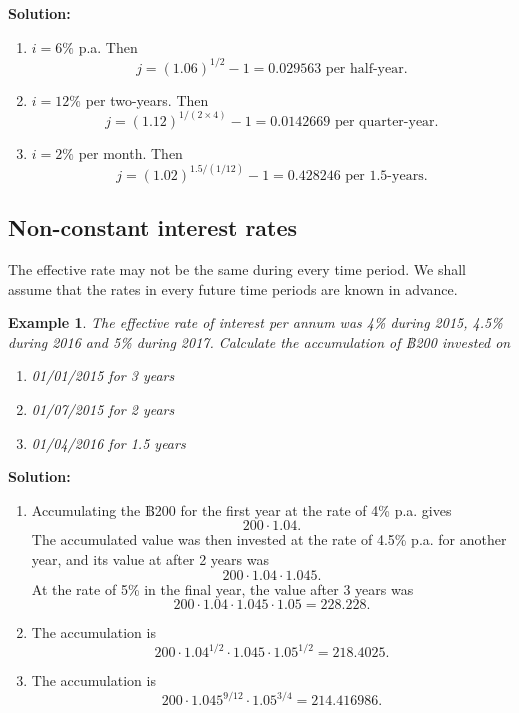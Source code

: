 \documentclass[
]{book}
\theoremstyle{definition}
\theoremstyle{definition}
\newtheorem{example}{Example}[chapter]
\theoremstyle{definition}
\theoremstyle{definition}
\theoremstyle{remark}
\begin{document}
\textbf{Solution:}

\begin{enumerate}
\def\labelenumi{\arabic{enumi}.}
\item
  \(i = 6\%\) p.a. Then
  \[j = (1.06)^{1/2} -1 = 0.029563 \text{ per half-year}.\]
\item
  \(i = 12\%\) per two-years. Then
  \[j = (1.12)^{1/(2\times4)} -1 = 0.0142669 \text{ per quarter-year}.\]
\item
  \(i = 2\%\) per month. Then
  \[j = (1.02)^{1.5/(1/12)} -1 = 0.428246 \text{ per 1.5-years}.\]
\end{enumerate}

\hypertarget{non-constant-interest-rates}{%
\subsection{Non-constant interest rates}\label{non-constant-interest-rates}}

The effective rate may not be the same during every time period. We
shall assume that the rates in every future time periods are known in
advance.

\begin{example}

\emph{The effective rate of interest per annum was 4\% during 2015, 4.5\%
during 2016 and 5\% during 2017. Calculate the accumulation of ฿200
invested on}

\begin{enumerate}
\def\labelenumi{\arabic{enumi}.}
\item
  \emph{01/01/2015 for 3 years}
\item
  \emph{01/07/2015 for 2 years}
\item
  \emph{01/04/2016 for 1.5 years}
\end{enumerate}

\end{example}

\textbf{Solution:}

\begin{enumerate}
\def\labelenumi{\arabic{enumi}.}
\item
  Accumulating the ฿200 for the first year at the rate of 4\% p.a.
  gives \[200 \cdot 1.04.\] The accumulated value was then invested at
  the rate of 4.5\% p.a. for another year, and its value at after 2
  years was \[200 \cdot 1.04 \cdot 1.045.\] At the rate of 5\% in the
  final year, the value after 3 years was
  \[200 \cdot 1.04 \cdot 1.045 \cdot 1.05 = 228.228.\]
\item
  The accumulation is
  \[200 \cdot 1.04^{1/2} \cdot 1.045 \cdot 1.05^{1/2} = 218.4025.\]
\item
  The accumulation is
  \[200 \cdot 1.045^{9/12} \cdot 1.05^{3/4} = 214.416986.\]
\end{enumerate}
\end{document}
